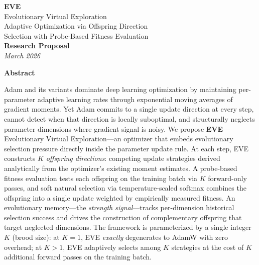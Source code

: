 \documentclass[12pt]{article}
\begin{document}
\begin{center}
  {\color{accent}\LARGE\bfseries EVE}\\[6pt]
  {\color{accent2}\Large Evolutionary Virtual Exploration}\\[8pt]
  {\large Adaptive Optimization via Offspring Direction\\[2pt]
  Selection with Probe-Based Fitness Evaluation}\\[10pt]
  {\normalsize\color{graytext}\bfseries Research Proposal}\\[6pt]
  {\normalsize\color{graytext}\itshape March 2026}\\[6pt]
\end{center}

\noindent{\color{rulecol}\rule{\linewidth}{1.2pt}}

\begin{center}
  {\bfseries Abstract}
\end{center}
\noindent
Adam and its variants dominate deep learning optimization by maintaining
per-parameter adaptive learning rates through exponential moving averages
of gradient moments.
Yet Adam commits to a single update direction at every step, cannot detect
when that direction is locally suboptimal, and structurally neglects
parameter dimensions where gradient signal is noisy.
We propose \textbf{EVE}---Evolutionary Virtual Exploration---an optimizer
that embeds evolutionary selection pressure directly inside the parameter
update rule.
At each step, EVE constructs $K$ \emph{offspring directions}: competing
update strategies derived analytically from the optimizer's existing
moment estimates.
A probe-based fitness evaluation tests each offspring on the training batch
via $K$ forward-only passes, and soft natural selection via
temperature-scaled softmax combines the offspring into a single update
weighted by empirically measured fitness.
An evolutionary memory---the \emph{strength signal}---tracks per-dimension
historical selection success and drives the construction of complementary
offspring that target neglected dimensions.
The framework is parameterized by a single integer $K$ (brood size):
at $K=1$, EVE \emph{exactly} degenerates to AdamW with zero overhead;
at $K>1$, EVE adaptively selects among $K$ strategies at the cost of
$K$ additional forward passes on the training batch.
\end{document}
